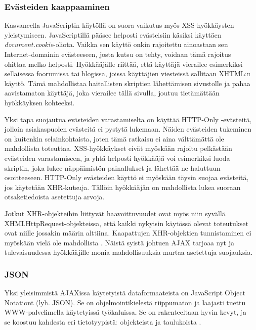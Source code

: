 \subsubsection{Evästeiden kaappaaminen}

Kasvaneella JavaScriptin käytöllä on suora vaikutus myös
XSS-hyökkäysten yleistymiseen. JavaScriptillä pääsee helposti
evästeisiin käsiksi käyttäen \emph{document.cookie}-oliota. Vaikka sen
käyttö onkin rajoitettu ainoastaan sen Internet-domainin evästeeseen,
josta kutsu on tehty, voidaan tämä rajoitus ohittaa melko
helposti. Hyökkääjälle riittää, että käyttäjä vierailee esimerkiksi
sellaisessa foorumissa tai blogissa, joissa käyttäjien viesteissä
sallitaan XHTML:n käyttö. Tämä mahdollistaa haitallisten skriptien
lähettämisen sivustolle ja pahaa aavistamaton käyttäjä, joka vierailee
tällä sivulla, joutuu tietämättään hyökkäyksen kohteeksi.

Yksi tapa suojautua evästeiden varastamiselta on käyttää HTTP-Only
-evästeitä, jolloin asiakaspuolen evästeitä ei pystytä
lukemaan. Näiden evästeiden tukeminen on kuitenkin selainkohtaista,
joten tämä ratkaisu ei aina välttämättä ole mahdollista
toteuttaa. XSS-hyökkäykset eivät myöskään rajoitu pelkästään
evästeiden varastamiseen, ja yhtä helposti hyökkääjä voi esimerkiksi
luoda skriptin, joka lukee näppäimistön painallukset ja lähettää ne
haluttuun osoitteeseen. HTTP-Only evästeiden käyttö ei myöskään täysin
suojaa evästeitä, jos käytetään XHR-kutsuja. Tällöin hyökkääjän on
mahdollista lukea suoraan otsaketiedoista asetettuja arvoja.

Jotkut XHR-objekteihin liittyvät haavoittuvuudet ovat myös niin
syvällä XHMLHttpRequest-objekteissa, että kaikki nykyisin käytössä
olevat toteutukset ovat niille jossakin määrin alttiina. Kaapattujen
XHR-objektien tunnistaminen ei myöskään vielä ole mahdollista
\cite{AJAX}. Näistä syistä johtuen AJAX tarjoaa nyt ja tulevaisuudessa
hyökkääjille monia mahdollisuuksia murtaa asetettuja suojauksia.

\subsubsection{JSON}

Yksi yleisimmistä AJAXissa käytetyistä dataformaateista on JavaScript
Object Notationt (lyh. JSON). Se on ohjelmointikielestä riippumaton ja
laajasti tuettu WWW-palvelimella käytetyissä työkaluissa. Se on
rakenteeltaan hyvin kevyt, ja se koostuu kahdesta eri tietotyypistä:
objekteista ja taulukoista \cite{JSON}.

